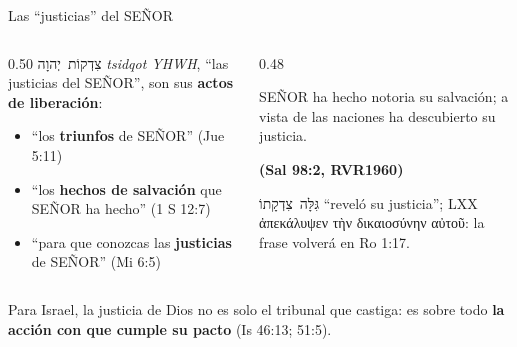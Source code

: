 \documentclass[hyperref={bookmarks=false},aspectratio=169]{beamer}
\newcommand{\heb}[1]{\mbox{\foreignlanguage{hebrew}{#1}}}
\newcommand{\grc}[1]{\foreignlanguage{ancientgreek}{#1}}
\newcommand{\SENOR}{S{\fontsize{0.78em}{1em}\selectfont EÑOR}}
\newcommand{\fuente}[1]{\par\hfill{\upshape\bfseries\footnotesize\textcolor{azul}{#1}}}
\newcommand{\destacar}[1]{\textbf{\textcolor{azul}{#1}}}
\begin{document}
\begin{frame}{Las ``justicias'' del \SENOR}
\begin{columns}[c,onlytextwidth]
\begin{column}{0.50\textwidth}\small
\heb{צִדְקוֹת יְהוָה} \emph{tsidqot YHWH}, ``las justicias del \SENOR'', son sus \destacar{actos de liberación}:
\begin{itemize}
\item ``los \textbf{triunfos} de \SENOR'' (Jue 5:11)
\item ``los \textbf{hechos de salvación} que \SENOR{} ha hecho'' (1 S 12:7)
\item ``para que conozcas las \textbf{justicias} de \SENOR'' (Mi 6:5)
\end{itemize}
\end{column}
\begin{column}{0.48\textwidth}
\begin{cita}\SENOR{} ha hecho notoria su salvación; a vista de las naciones ha descubierto su justicia.\fuente{(Sal 98:2, RVR1960)}\end{cita}
\scriptsize\heb{גִּלָּה צִדְקָתוֹ} ``reveló su justicia''; LXX \grc{ἀπεκάλυψεν τὴν δικαιοσύνην αὐτοῦ}: la frase volverá en Ro 1:17.
\end{column}
\end{columns}\par\medskip
\small Para Israel, la justicia de Dios no es solo el tribunal que castiga: es sobre todo \destacar{la acción con que cumple su pacto} (Is 46:13; 51:5).
\end{frame}
\end{document}
